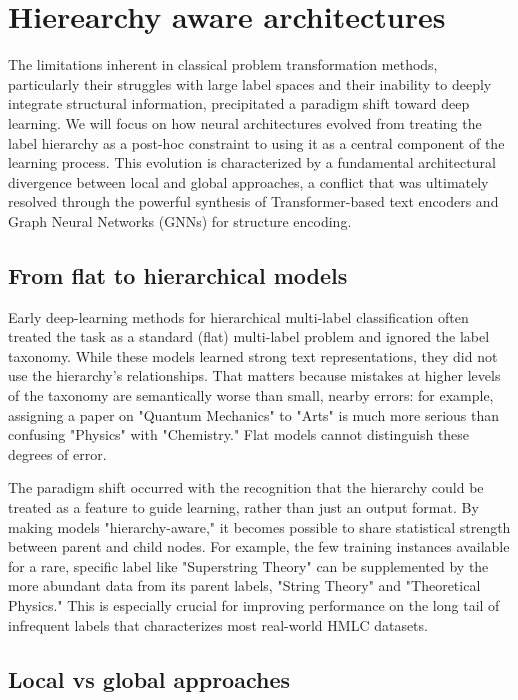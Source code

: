 \section{Hierearchy aware architectures}
The limitations inherent in classical problem transformation methods, particularly their struggles with large label spaces and their inability to deeply integrate structural information, precipitated a paradigm shift toward deep learning.
We will focus on how neural architectures evolved from treating the label hierarchy as a post-hoc constraint to using it as a central component of the learning process.
This evolution is characterized by a fundamental architectural divergence between local and global approaches, a conflict that was ultimately resolved through the powerful synthesis of Transformer-based text encoders and Graph Neural Networks (GNNs) for structure encoding.

\subsection{From flat to hierarchical models}
Early deep-learning methods for hierarchical multi-label classification often treated the task as a standard (flat) multi-label problem and ignored the label taxonomy. While these models learned strong text representations, they did not use the hierarchy's relationships. That matters because mistakes at higher levels of the taxonomy are semantically worse than small, nearby errors: for example, assigning a paper on "Quantum Mechanics" to "Arts" is much more serious than confusing "Physics" with "Chemistry." Flat models cannot distinguish these degrees of error.~\cite{xu-etal-2021-hierarchical}

The paradigm shift occurred with the recognition that the hierarchy could be treated as a feature to guide learning, rather than just an output format. By making models "hierarchy-aware," it becomes possible to share statistical strength between parent and child nodes. For example, the few training instances available for a rare, specific label like "Superstring Theory" can be supplemented by the more abundant data from its parent labels, "String Theory" and "Theoretical Physics." This is especially crucial for improving performance on the long tail of infrequent labels that characterizes most real-world HMLC datasets.~\cite{Zangari2024}

\subsection{Local vs global approaches}

